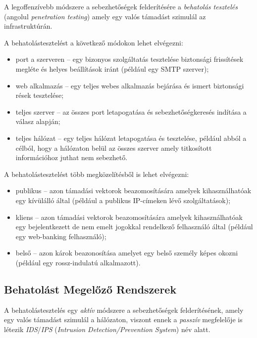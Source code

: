 \documentclass[a4paper,12pt]{article}
\begin{document}
	A legoffenzívebb módszere a sebezhetőségek felderítésére a \textit{behatolás tesztelés} (angolul \textit{penetration testing}) amely egy valós támadást szimulál az infrastruktúrán.
	
	\noindent A behatolástesztelést a következő módokon lehet elvégezni:
	
	\begin{itemize}
		\item port a szerveren -- egy bizonyos szolgáltatás tesztelése biztonsági frissítések megléte és helyes beállítások iránt (például egy SMTP szerver);
		\item web alkalmazás -- egy teljes webes alkalmazás bejárása és ismert biztonsági rések tesztelése;
		\item teljes szerver -- az összes port letapogatása és sebezhetőségkeresés indítása a válasz alapján;
		\item teljes hálózat -- egy teljes hálózat letapogatása és tesztelése, például abból a célból, hogy a hálózaton belül az összes szerver amely titkosított információhoz juthat nem sebezhető.
	\end{itemize}
	
	\noindent A behatolástesztelést több megközelítésből is lehet elvégezni:
	
	\begin{itemize}
		\item publikus -- azon támadási vektorok beazomosítására amelyek kihasználhatóak egy kívülálló által (például a publikus IP-címeken lévő szolgáltatások);
		\item kliens -- azon támadási vektorok beazomosítására amelyek kihasználhatóak egy bejelentkezett de nem emelt jogokkal rendelkező felhasználó által (például egy web-banking felhasználó);
		\item belső -- azon károk beazonosítása amelyet egy belső személy képes okozni (például egy rossz-indulatú alkalmazott).
	\end{itemize}

\subsection{Behatolást Megelőző Rendszerek}
	
	A behatolástesztelés egy \textit{aktív} módszere a sebezhetőségek felderítésének, amely egy valós támadást szimulál a hálózaton, viszont ennek a \textit{passzív} megfelelője is létezik \textit{IDS}/\textit{IPS} (\textit{Intrusion Detection/Prevention System}) név alatt.
	
\end{document}
